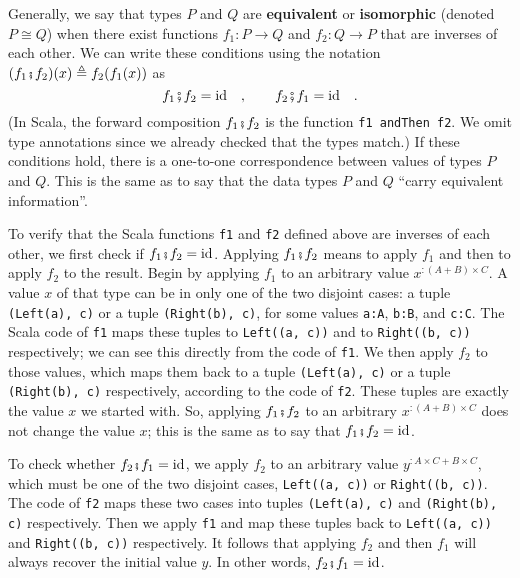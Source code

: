 Generally, we say that types $P$ and $Q$ are \textbf{equivalent}
or \textbf{isomorphic} (denoted $P\cong Q$) when
there exist functions $f_{1}:P\rightarrow Q$ and $f_{2}:Q\rightarrow P$
that are inverses of each other. We can write these conditions using
the notation $(f_{1}\bef f_{2})(x)\triangleq f_{2}(f_{1}(x))$ as
\[
f_{1}\bef f_{2}=\text{id}\quad,\quad\quad f_{2}\bef f_{1}=\text{id}\quad.
\]
(In Scala, the forward composition $f_{1}\bef f_{2}$ is the function
\lstinline!f1 andThen f2!. We omit type annotations since we already
checked that the types match.) If these conditions hold, there is
a one-to-one correspondence between values of types $P$ and $Q$.
This is the same as to say that the data types $P$ and $Q$ \textsf{``}carry
equivalent information\textsf{''}.

To verify that the Scala functions \lstinline!f1! and \lstinline!f2!
defined above are inverses of each other, we first check if $f_{1}\bef f_{2}=\text{id}$.
Applying $f_{1}\bef f_{2}$ means to apply $f_{1}$ and then to apply
$f_{2}$ to the result. Begin by applying $f_{1}$ to an arbitrary
value $x^{:(A+B)\times C}$. A value $x$ of that type can be in only
one of the two disjoint cases: a tuple \lstinline!(Left(a), c)! or
a tuple \lstinline!(Right(b), c)!, for some values \lstinline!a:A!,
\lstinline!b:B!, and \lstinline!c:C!. The Scala code of \lstinline!f1!
maps these tuples to \lstinline!Left((a, c))! and to \lstinline!Right((b, c))!
respectively; we can see this directly from the code of \lstinline!f1!.
We then apply $f_{2}$ to those values, which maps them back to a
tuple \lstinline!(Left(a), c)! or a tuple \lstinline!(Right(b), c)!
respectively, according to the code of \lstinline!f2!. These tuples
are exactly the value $x$ we started with. So, applying $f_{1}\bef f_{2}$
to an arbitrary $x^{:(A+B)\times C}$ does not change the value $x$;
this is the same as to say that $f_{1}\bef f_{2}=\text{id}$.

To check whether $f_{2}\bef f_{1}=\text{id}$, we apply $f_{2}$ to
an arbitrary value $y^{:A\times C+B\times C}$, which must be one
of the two disjoint cases, \lstinline!Left((a, c))! or \lstinline!Right((b, c))!.
The code of \lstinline!f2! maps these two cases into tuples \lstinline!(Left(a), c)!
and \lstinline!(Right(b), c)! respectively. Then we apply \lstinline!f1!
and map these tuples back to \lstinline!Left((a, c))! and \lstinline!Right((b, c))!
respectively. It follows that applying $f_{2}$ and then $f_{1}$
will always recover the initial value $y$. In other words, $f_{2}\bef f_{1}=\text{id}$.

